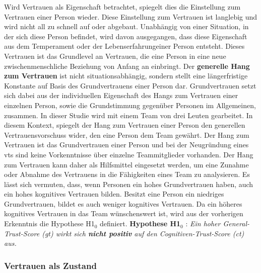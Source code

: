 \documentclass[a4paper,11pt]{article}%
\renewcommand{\\}{\vspace*{0.5\baselineskip} \newline}
\begin{document}
Wird Vertrauen als Eigenschaft betrachtet, spiegelt dies die Einstellung zum Vertrauen einer Person wieder. Diese Einstellung zum Vertrauen ist langlebig und wird nicht all zu schnell auf oder abgebaut. Unabhängig von einer Situation, in der sich diese Person befindet, wird davon ausgegangen, dass diese Eigenschaft aus dem Temperament oder der Lebenserfahrungeiner Person entsteht. Dieses Vertrauen ist das Grundlevel an Vertrauen, die eine Person in eine neue zwischenmenschliche Beziehung von Anfang an einbringt.
\\
Der \textbf{generelle Hang zum Vertrauen} ist nicht situationsabhängig, sondern stellt eine längerfristige Konstante auf Basis des Grundvertrauens einer Person dar. Grundvertrauen setzt sich dabei aus der individuellen Eigenschaft des Hangs zum Vertrauen einer einzelnen Person, sowie die Grundstimmung gegenüber Personen im Allgemeinen, zusammen.\citep{couch1996assessment} 
\\
In dieser Studie wird mit einem Team von drei Leuten gearbeitet. In diesem Kontext, spiegelt der Hang zum Vertrauen einer Person den generellen Vertrauensvorschuss wider, den eine Person dem Team gewährt.
Der Hang zum Vertrauen ist das Grundvertrauen einer Person und bei der Neugründung eines \ac{vts} sind keine Vorkenntnisse über einzelne Teammitglieder vorhanden. Der Hang zum Vertrauen kann daher als Hilfsmittel eingesetzt werden, um eine Zunahme oder Abnahme des Vertrauens in die Fähigkeiten eines Team zu analysieren.
Es lässt sich vermuten, dass, wenn Personen ein hohes Grundvertrauen haben, auch ein hohes kognitives Vertrauen bilden. Besitzt eine Person ein niedriges Grundvertrauen, bildet es auch weniger kognitives Vertrauen. 
\\
Da ein höheres kognitives Vertrauen in das Team wünschenswert ist, wird aus der vorherigen Erkenntnis die Hypothese H1$_{0}$ definiert.
\\
\textbf{Hypothese H1$_{0}$} : \textit{Ein hoher General-Trust-Score (\ac{gt}) wirkt sich \textbf{nicht positiv} auf den Cognitiven-Trust-Score (\ac{ct}) aus.}

	\subsubsection{Vertrauen als Zustand}
\end{document}
